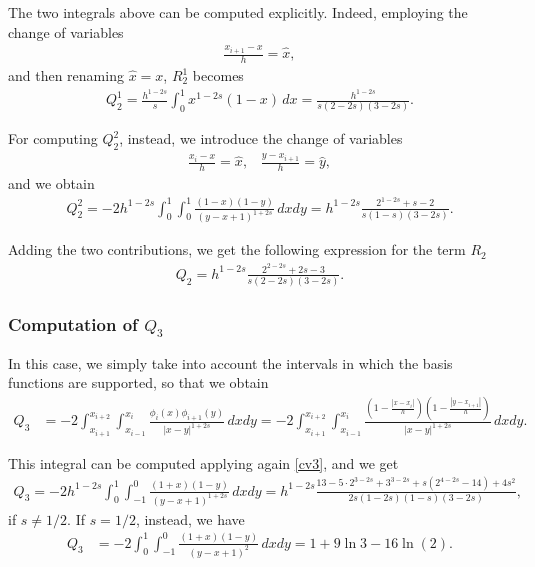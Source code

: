 {The two integrals above can be computed explicitly. Indeed, employing the change of variables
\begin{align}\label{cv2}
	\frac{x_{i+1}-x}{h}=\hat{x},
\end{align}
and then renaming $\hat{x}=x$, $R_2^1$ becomes
\begin{align*}
	Q_2^1=\frac{h^{1-2s}}{s}\int_0^1 x^{1-2s}(1-x)\,dx = \frac{h^{1-2s}}{s(2-2s)(3-2s)}.
\end{align*}

For computing $Q_2^2$, instead, we introduce the change of variables
\begin{align}\label{cv3}
	\frac{x_i-x}{h}=\hat{x},\;\;\;\frac{y-x_{i+1}}{h}=\hat{y},
\end{align}
and we obtain
\begin{align*}
	Q_2^2 = -2h^{1-2s}\int_0^1\int_0^1\frac{(1-x)(1-y)}{(y-x+1)^{1+2s}}\,dxdy = h^{1-2s}\frac{2^{1-2s}+s-2}{s(1-s)(3-2s)}.
\end{align*}

Adding the two contributions, we get the following expression for the term $R_2$
\begin{align}\label{Q2}
	Q_2 = h^{1-2s}\frac{2^{2-2s}+2s-3}{s(2-2s)(3-2s)}.
\end{align}

\subsubsection*{Computation of $Q_3$}
In this case, we simply take into account the intervals in which the basis functions are supported, so that we obtain
\begin{align*}
	Q_3 &= -2\int_{x_{i+1}}^{x_{i+2}}\int_{x_{i-1}}^{x_i} \frac{\phi_i(x)\phi_{i+1}(y)}{|x-y|^{1+2s}}\,dxdy = - 2\int_{x_{i+1}}^{x_{i+2}}\int_{x_{i-1}}^{x_i} \frac{\left(1-\frac{|x-x_i|}{h}\right)\left(1-\frac{|y-x_{i+1}|}{h}\right)}{|x-y|^{1+2s}}\,dxdy.
\end{align*}

This integral can be computed applying again \eqref{cv3}, and we get
\begin{align}\label{Q3}
	Q_3 = -2h^{1-2s}\int_0^1\int_{-1}^0 \frac{(1+x)(1-y)}{(y-x+1)^{1+2s}}\,dxdy = h^{1-2s}\frac{13-5\cdot 2^{3-2s}+3^{3-2s}+s(2^{4-2s}-14)+4s^2}{2s(1-2s)(1-s)(3-2s)},
\end{align}
if $s\neq 1/2$. If $s=1/2$, instead, we have 
\begin{align*}
	Q_3 &= -2\int_0^1\int_{-1}^0 \frac{(1+x)(1-y)}{(y-x+1)^2}\,dxdy = 1+9\ln 3-16\ln(2).
\end{align*}

}
